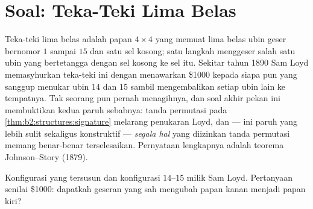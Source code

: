 \section{Soal: Teka-Teki Lima Belas}

Teka-teki lima belas adalah papan $4 \times 4$ yang memuat lima belas
ubin geser bernomor $1$ sampai $15$ dan satu sel kosong; satu langkah
menggeser salah satu ubin yang bertetangga dengan sel kosong ke sel itu.
Sekitar tahun 1890 Sam Loyd memasyhurkan teka-teki ini dengan menawarkan
\$1000 kepada siapa pun yang sanggup menukar ubin $14$ dan $15$ sambil
mengembalikan setiap ubin lain ke tempatnya. Tak seorang pun pernah
menagihnya, dan soal akhir pekan ini membuktikan kedua paruh sebabnya:
tanda permutasi pada \cref{thm:b2:structures:signature} melarang
penukaran Loyd, dan --- ini paruh yang lebih sulit sekaligus konstruktif
--- \emph{segala hal} yang diizinkan tanda permutasi memang benar-benar
terselesaikan. Pernyataan lengkapnya adalah teorema Johnson--Story (1879).

\begin{omfigure}
\qquad
{}

{\small Konfigurasi yang tersusun dan konfigurasi $14$--$15$ milik Sam
Loyd. Pertanyaan senilai \$1000: dapatkah geseran yang sah mengubah
papan kanan menjadi papan kiri?}
\end{omfigure}

